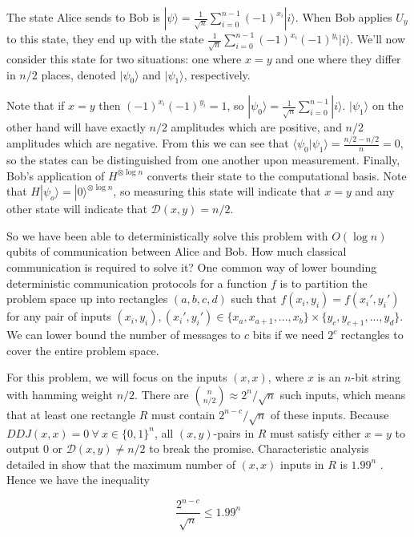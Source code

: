 \documentclass[a4paper]{article}
\begin{document}
        The state Alice sends to Bob is $|\psi\rangle = \frac{1}{\sqrt{n}}\sum_{i=0}^{n-1} (-1)^{x_i}|i\rangle$. When Bob applies $U_y$ to this state, they end up with the state $\frac{1}{\sqrt{n}}\sum_{i=0}^{n-1}(-1)^{x_i}(-1)^{y_i}|i\rangle$. We'll now consider this state for two situations: one where $x = y$ and one where they differ in $n/2$ places, denoted $|\psi_0\rangle$ and $|\psi_1\rangle$, respectively.

        Note that if $x = y$ then $(-1)^{x_i}(-1)^{y_i} = 1$, so $|\psi_0\rangle = \frac{1}{\sqrt{n}}\sum_{i = 0}^{n-1}|i\rangle$. $|\psi_1\rangle$ on the other hand will have exactly $n/2$ amplitudes which are positive, and $n/2$ amplitudes which are negative. From this we can see that $\langle\psi_0|\psi_1\rangle = \frac{n/2 - n/2}{n} = 0$, so the states can be distinguished from one another upon measurement. Finally, Bob's application of $H^{\otimes \log n}$ converts their state to the computational basis. Note that $H|\psi_o\rangle = |0\rangle^{\otimes\log n}$, so measuring this state will indicate that $x = y$ and any other state will indicate that $\mathcal{D}(x, y) = n/2$.

        So we have been able to deterministically solve this problem with $O(\log n)$ qubits of communication between Alice and Bob. How much classical communication is required to solve it? One common way of lower bounding deterministic communication protocols for a function $f$ is to partition the problem space up into rectangles $(a, b, c, d)$ such that $f(x_i, y_i) = f(x_i', y_i')$ for any pair of inputs $(x_i, y_i), (x_i', y_i') \in \{x_a,x_{a + 1},...,x_{b}\} \times \{y_c, y_{c+1},...,y_d\}$. We can lower bound the number of messages to $c$ bits if we need $2^c$ rectangles to cover the entire problem space.

        For this problem, we will focus on the inputs $(x, x)$, where $x$ is an $n$-bit string with hamming weight $n/2$. There are $\binom{n}{n/2} \approx 2^n/\sqrt{n}$ such inputs, which means that at least one rectangle $R$ must contain $2^{n-c}/\sqrt{n}$ of these inputs. Because $DDJ(x, x) = 0 ~\forall~x\in \{0, 1\}^n$, all $(x, y)$-pairs in $R$ must satisfy either $x = y$ to output $0$ or $\mathcal{D}(x, y) \neq n/2$ to break the promise. Characteristic analysis detailed in \cite{RevModPhys.82.665} show that the maximum number of $(x, x)$ inputs in $R$ is $1.99^n$ \cite{frankl1987forbidden}. Hence we have the inequality

        $$\frac{2^{n-c}}{\sqrt{n}} \leq 1.99^n$$
\end{document}
